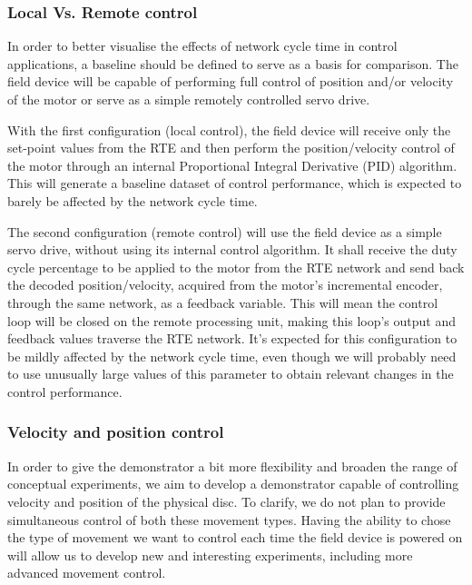 \subsubsection{Local Vs. Remote control} \label{subsec:local_remote}

In order to better visualise the effects of network cycle time in control applications, a baseline should be defined to serve as a basis for comparison.
The field device will be capable of performing full control of position and/or velocity of the motor or serve as a simple remotely controlled servo drive.

With the first configuration (local control), the field device will receive only the set-point values from the RTE and then perform the position/velocity control of the motor through an internal Proportional Integral Derivative (PID) algorithm.
This will generate a baseline dataset of control performance, which is expected to barely be affected by the network cycle time.

The second configuration (remote control) will use the field device as a simple servo drive, without using its internal control algorithm.
It shall receive the duty cycle percentage to be applied to the motor from the RTE network and send back the decoded position/velocity, acquired from the motor's incremental encoder, through the same network, as a feedback variable.
This will mean the control loop will be closed on the remote processing unit, making this loop's output and feedback values traverse the RTE network.
It's expected for this configuration to be mildly affected by the network cycle time, even though we will probably need to use unusually large values of this parameter to obtain relevant changes in the control performance.

\subsubsection{Velocity and position control}

In order to give the demonstrator a bit more flexibility and broaden the range of conceptual experiments, we aim to develop a demonstrator capable of controlling velocity and position of the physical disc.
To clarify, we do not plan to provide simultaneous control of both these movement types.
Having the ability to chose the type of movement we want to control each time the field device is powered on will allow us to develop new and interesting experiments, including more advanced movement control.
